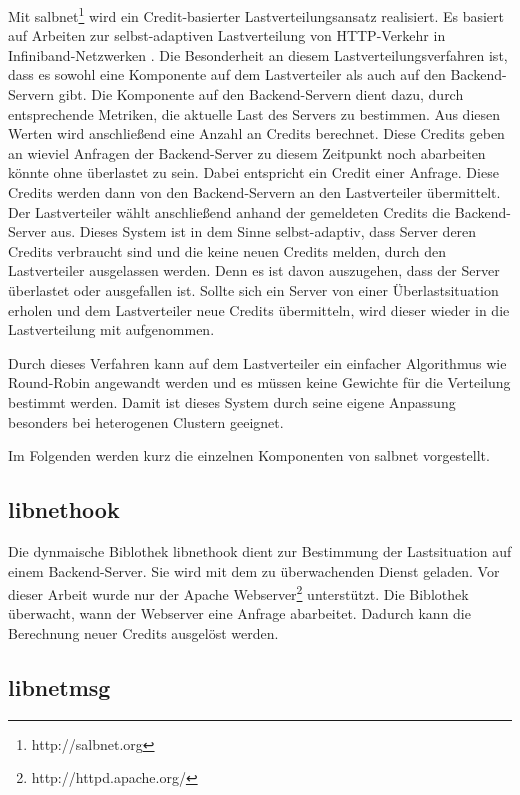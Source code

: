 \documentclass[a4paper, 12pt, BCOR10mm, DIV12, toc=bibliography, toc=listof, german]{scrbook}
\begin{document}
		Mit salbnet\footnote{http://salbnet.org} wird ein Credit-basierter Lastverteilungsansatz
		realisiert. Es basiert auf Arbeiten zur selbst-adaptiven Lastverteilung von HTTP-Verkehr in
		Infiniband-Netzwerken \cite{zinke2007, scsczile2008}. Die Besonderheit an diesem
		Lastverteilungsverfahren ist, dass es sowohl eine Komponente auf dem Lastverteiler als auch auf
		den Backend-Servern gibt. Die Komponente auf den Backend-Servern dient dazu, durch entsprechende
		Metriken, die aktuelle Last des Servers zu bestimmen. Aus diesen Werten wird anschließend eine
		Anzahl an Credits berechnet. Diese Credits geben an wieviel Anfragen der Backend-Server zu
		diesem Zeitpunkt noch abarbeiten könnte ohne überlastet zu sein. Dabei entspricht ein Credit
		einer Anfrage. Diese Credits werden dann von den Backend-Servern an den Lastverteiler
		übermittelt. Der Lastverteiler wählt anschließend anhand der gemeldeten Credits die
		Backend-Server aus. Dieses System ist in dem Sinne selbst-adaptiv, dass Server deren Credits
		verbraucht sind und die keine neuen Credits melden, durch den Lastverteiler ausgelassen werden.
		Denn es ist davon auszugehen, dass der Server überlastet oder ausgefallen ist. Sollte sich ein
		Server von einer Überlastsituation erholen und dem Lastverteiler neue Credits übermitteln, wird
		dieser wieder in die Lastverteilung mit aufgenommen.

		Durch dieses Verfahren kann auf dem Lastverteiler ein einfacher Algorithmus wie Round-Robin
		angewandt werden und es müssen keine Gewichte für die Verteilung bestimmt werden. Damit ist
		dieses System durch seine eigene Anpassung besonders bei heterogenen Clustern geeignet.

		Im Folgenden werden kurz die einzelnen Komponenten von salbnet vorgestellt.

			\subsection*{libnethook} %

			Die dynmaische Biblothek libnethook dient zur Bestimmung der Lastsituation auf einem
			Backend-Server. Sie wird mit dem zu überwachenden Dienst geladen. Vor dieser Arbeit wurde nur
			der Apache Webserver\footnote{http://httpd.apache.org/} unterstützt. Die Biblothek überwacht,
			wann der Webserver eine Anfrage abarbeitet. Dadurch kann die Berechnung neuer Credits
			ausgelöst werden.
			

			\subsection*{libnetmsg} %
\end{document}
